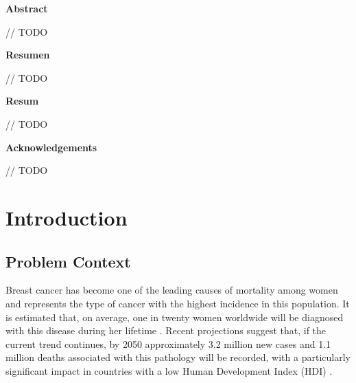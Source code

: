 \documentclass[a4paper,10pt]{book}
\begin{document}
\newpage
{}
\noindent \textbf{\large Abstract}

// TODO


\newpage
{}
\noindent \textbf{\large Resumen}

// TODO


\newpage
{}
\noindent \textbf{\large Resum}

// TODO

\newpage
{}
\noindent \textbf{\large Acknowledgements}

// TODO
 \setcounter{page}{0}
\let\cleardoublepage\clearpage
\tableofcontents
\newpage \thispagestyle{empty}

\pagestyle{fancy}
\newpage \thispagestyle{empty}
\mainmatter
\chapter{Introduction}
\section{Problem Context}

Breast cancer has become one of the leading causes of mortality among women and represents the type of cancer with the highest incidence in this population. It is estimated that, on average, one in twenty women worldwide will be diagnosed with this disease during her lifetime \cite{kim_global_2025}. Recent projections suggest that, if the current trend continues, by 2050 approximately 3.2 million new cases and 1.1 million deaths associated with this pathology will be recorded, with a particularly significant impact in countries with a low Human Development Index (HDI) \cite{kim_global_2025}.
\end{document}
